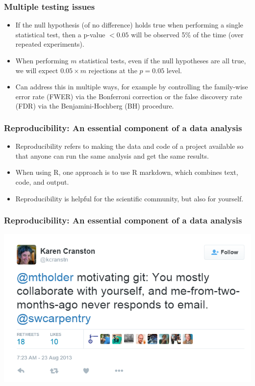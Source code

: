 \documentclass{beamer}
\begin{document}
\begin{frame}
\frametitle{Multiple testing issues}

\begin{itemize}
\item If the null hypothesis (of no difference) holds true when performing a single statistical test,
then a p-value $< 0.05$ will be observed 5\% of the time (over repeated experiments).
\item When performing $m$ statistical tests, even if the null hypotheses are all true, we will expect
$0.05 \times m$ rejections at the $p = 0.05$ level.
\item Can address this in multiple ways, for example by controlling the family-wise error rate (FWER)
via the Bonferroni correction or the false discovery rate (FDR) via the Benjamini-Hochberg (BH) procedure.
\end{itemize}

\end{frame}


\begin{frame}
\frametitle{Reproducibility: An essential component of a data analysis}

\begin{itemize}
\item Reproducibility refers to making the data and code of a project available so that anyone can run the same analysis
and get the same results.
\item When using R, one approach is to use R markdown, which combines text, code, and output.
\item Reproducibility is helpful for the scientific community, but also for yourself.
\end{itemize}

\end{frame}


\begin{frame}
\frametitle{Reproducibility: An essential component of a data analysis}

\includegraphics[height=0.72\textheight, center]{reproducibility_tweet.png}

\end{frame}

\end{document}
